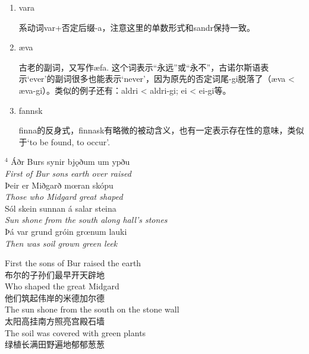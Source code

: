 \begin{grammar*}{}
    \begin{enumerate}[leftmargin=*]
        \item vara

              系动词var+否定后缀-a，注意这里的单数形式和sandr保持一致。

        \item æva

              古老的副词，又写作æfa. 这个词表示“永远”或“永不”，古诺尔斯语表示`ever'的副词很多也能表示`never'，因为原先的否定词尾-gi脱落了（æva < æva-gi）。类似的例子还有：aldri < aldri-gi; ei < ei-gi等。

        \item fannsk

              finna的反身式，finnask有略微的被动含义，也有一定表示存在性的意味，类似于`to be found, to occur'.

    \end{enumerate}
\end{grammar*}
\medskip %
\begin{paracol}{2}
    \noindent
    $^4 $ Áðr Burs synir bjǫðum um ypðu\\
    \textit{First of Bur sons earth over raised}\\
    Þeir er Miðgarð mœran skópu\\
    \textit{Those who Midgard great shaped}\\
    Sól skein sunnan á salar steina\\
    \textit{Sun shone from the south along hall's stones}\\
    Þá var grund gróin grœnum lauki\\
    \textit{Then was soil grown green leek}\\
    \switchcolumn

    \noindent
    First the sons of Bur raised the earth\\
    布尔的子孙们最早开天辟地\\
    Who shaped the great Midgard\\
    他们筑起伟岸的米德加尔德\\
    The sun shone from the south on the stone wall\\
    太阳高挂南方照亮宫殿石墙\\
    The soil was covered with green plants\\
    绿植长满田野遍地郁郁葱葱\\

\end{paracol}

